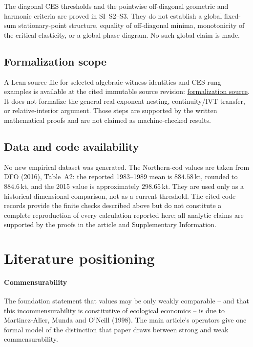 \documentclass[preprint,11pt,authoryear]{elsarticle}
\theoremstyle{remark}
\begin{document}
The diagonal CES thresholds and the pointwise off-diagonal geometric and harmonic criteria are proved in SI~S2--S3. They do not establish a global fixed-sum stationary-point structure, equality of off-diagonal minima, monotonicity of the critical elasticity, or a global phase diagram. No such global claim is made.

\subsection{Formalization scope}

A Lean source file for selected algebraic witness identities and CES rung examples is available at the cited immutable source revision: \href{https://github.com/MIKEAA2020/general-sustainability/blob/6f626ee48b2a3a59282b5df5adda76c8d5993fdc/lean/Formalizations/P1_AssessmentSeparation.lean}{formalization source}. It does not formalize the general real-exponent nesting, continuity/IVT transfer, or relative-interior argument. Those steps are supported by the written mathematical proofs and are not claimed as machine-checked results.

\subsection{Data and code availability}

No new empirical dataset was generated. The Northern-cod values are taken from DFO (2016), Table~A2: the reported 1983--1989 mean is $884.58$\,kt, rounded to $884.6$\,kt, and the 2015 value is approximately $298.65$\,kt. They are used only as a historical dimensional comparison, not as a current threshold. The cited code records provide the finite checks described above but do not constitute a complete reproduction of every calculation reported here; all analytic claims are supported by the proofs in the article and Supplementary Information.

\section{Literature positioning}\label{si:positioning}

\paragraph{Commensurability} The foundation statement that values may be only weakly comparable -- and that this incommensurability is constitutive of ecological economics -- is due to Martinez-Alier, Munda and O'Neill (1998). The main article's operators give one formal model of the distinction that paper draws between strong and weak commensurability.
\end{document}

